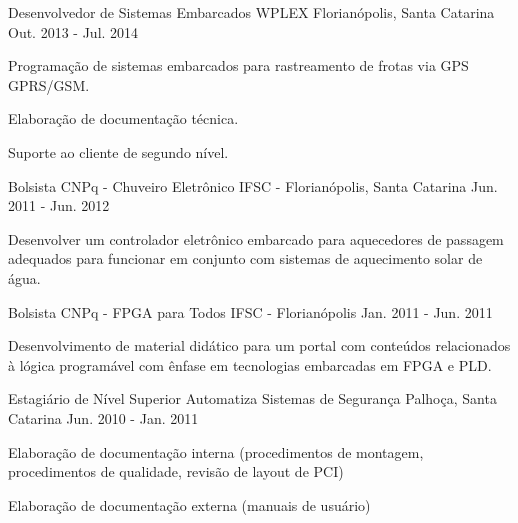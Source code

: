 \begin{cventries}
  \cventry
    {Desenvolvedor de Sistemas Embarcados} %
    {WPLEX} %
    {Florianópolis, Santa Catarina} %
    {Out. 2013 - Jul. 2014} %
    {
      \begin{cvitems} %
        \item {Programação de sistemas embarcados para rastreamento de frotas via GPS GPRS/GSM. }
        \item {Elaboração de documentação técnica.}
        \item {Suporte ao cliente de segundo nível.}
      \end{cvitems}
    }

  \cventry
    {Bolsista} %
    {CNPq - Chuveiro Eletrônico} %
    {IFSC - Florianópolis, Santa Catarina} %
    {Jun. 2011 - Jun. 2012} %
    {
      \begin{cvitems} %
        \item {Desenvolver um controlador eletrônico embarcado para aquecedores de passagem adequados para funcionar em conjunto com sistemas de aquecimento solar de água.}
      \end{cvitems}
    }

  \cventry
    {Bolsista} %
    {CNPq - FPGA para Todos}
    {IFSC - Florianópolis} %
    {Jan. 2011 - Jun. 2011} %
    {
      \begin{cvitems} %
        \item {Desenvolvimento de material didático para um portal com conteúdos relacionados à lógica programável com ênfase em tecnologias embarcadas em FPGA e PLD.}
      \end{cvitems}
    }
  \cventry
    {Estagiário de Nível Superior} %
    {Automatiza Sistemas de Segurança} %
    {Palhoça, Santa Catarina} %
    {Jun. 2010 - Jan. 2011} %
    {
      \begin{cvitems} %
      \item {Elaboração de documentação interna (procedimentos de montagem, procedimentos de qualidade, revisão de layout de PCI)}
      \item {Elaboração de documentação externa (manuais de usuário)}
      \end{cvitems}
    }


\end{cventries}
